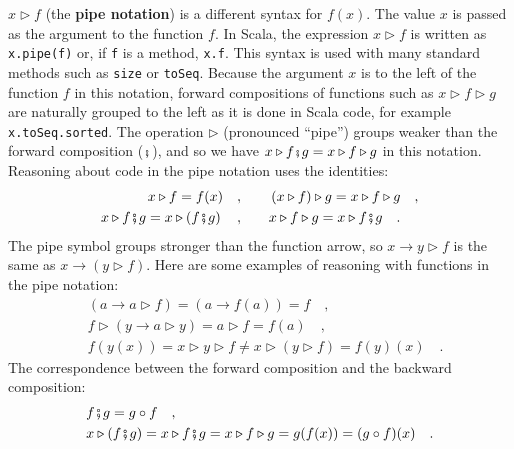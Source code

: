 $x\triangleright f$ (the \textbf{pipe notation})
is a different syntax for $f(x)$. The value $x$ is passed as the
argument to the function $f$. In Scala, the expression $x\triangleright f$
is written as \lstinline!x.pipe(f)! or, if \lstinline!f! is a method,
\lstinline!x.f!. This syntax is used with many standard methods such
as \lstinline!size! or \lstinline!toSeq!. Because the argument $x$
is to the left of the function $f$ in this notation, forward compositions
of functions such as $x\triangleright f\triangleright g$ are naturally
grouped to the left as it is done in Scala code, for example \lstinline!x.toSeq.sorted!.
The operation $\triangleright$ (pronounced \textsf{``}pipe\textsf{''}) groups weaker
than the forward composition ($\bef$), and so we have $x\triangleright f\bef g=x\triangleright f\triangleright g$
in this notation. Reasoning about code in the pipe notation uses the
identities:
\begin{align*}
x\triangleright f=f(x)\quad,\quad\quad & \left(x\triangleright f\right)\triangleright g=x\triangleright f\triangleright g\quad,\\
x\triangleright f\bef g=x\triangleright\left(f\bef g\right)\quad,\quad\quad & x\triangleright f\triangleright g=x\triangleright f\bef g\quad.
\end{align*}
The pipe symbol groups stronger than the function arrow, so $x\rightarrow y\triangleright f$
is the same as $x\rightarrow(y\triangleright f)$. Here are some examples
of reasoning with functions in the pipe notation:
\begin{align*}
 & \left(a\rightarrow a\triangleright f\right)=\left(a\rightarrow f(a)\right)=f\quad,\\
 & f\triangleright\left(y\rightarrow a\triangleright y\right)=a\triangleright f=f(a)\quad,\\
 & f(y(x))=x\triangleright y\triangleright f\neq x\triangleright\left(y\triangleright f\right)=f(y)(x)\quad.
\end{align*}
The correspondence between the forward composition and the backward
composition:
\begin{align*}
 & f\bef g=g\circ f\quad,\\
 & x\triangleright(f\bef g)=x\triangleright f\bef g=x\triangleright f\triangleright g=g(f(x))=(g\circ f)(x)\quad.
\end{align*}

